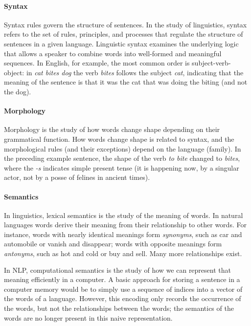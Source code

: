 \paragraph{Syntax} Syntax rules govern the structure of sentences. In the study of linguistics, syntax refers to the set of rules, principles, and processes that regulate the structure of sentences in a given language. Linguistic syntax examines the underlying logic that allows a speaker to combine words into well-formed and meaningful sequences. In English, for example, the most common order is subject-verb-object: in {\em cat bites dog} the verb {\em bites} follows the subject {\em cat}, indicating that the meaning of the sentence is that it was the cat that was doing the biting (and not the dog). 
    
\paragraph{Morphology} Morphology is the study of how words change shape depending on their grammatical function. How words change shape is related to syntax, and the morphological rules (and their exceptions)  depend on the language (family). In the preceding example sentence, the shape of the verb {\em to bite} changed to {\em bites}, where the {\em -s} indicates simple present tense (it is happening now, by a singular actor, not by a posse of felines in ancient times).
    
\paragraph{Semantics} In linguistics, lexical semantics is the  study of the meaning of words. In natural languages words derive their meaning from their relationship to other words. For instance, words with nearly identical meanings form {\em synonyms}, such as car and automobile or vanish and disappear; words with opposite meanings form {\em antonyms}, such as hot and cold or buy and sell. Many more relationships exist. 
    
In NLP, computational semantics is the study of how we can represent that meaning efficiently in a computer. A basic approach for storing a sentence in a computer memory would be to simply use a sequence of indices into a vector of the words of a language. However, this encoding only records the occurrence of the words, but not the relationships between the words; the semantics of the words are no longer present in this naive representation.

